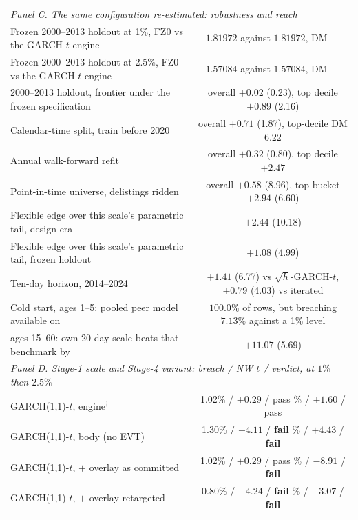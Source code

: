 \begin{tabular}{lcc}
\midrule
\multicolumn{3}{l}{\emph{Panel C. The same configuration re-estimated: robustness and reach}} \\
Frozen 2000--2013 holdout at 1\%, FZ0 vs the GARCH-$t$ engine & \multicolumn{2}{c}{$1.81972$ against $1.81972$, DM ---} \\
Frozen 2000--2013 holdout at 2.5\%, FZ0 vs the GARCH-$t$ engine & \multicolumn{2}{c}{$1.57084$ against $1.57084$, DM ---} \\
2000--2013 holdout, frontier under the frozen specification & \multicolumn{2}{c}{overall $+0.02$ (0.23), top decile $+0.89$ (2.16)} \\
Calendar-time split, train before 2020 & \multicolumn{2}{c}{overall $+0.71$ (1.87), top-decile DM 6.22} \\
Annual walk-forward refit & \multicolumn{2}{c}{overall $+0.32$ (0.80), top decile $+2.47$} \\
Point-in-time universe, delistings ridden & \multicolumn{2}{c}{overall $+0.58$ (8.96), top bucket $+2.94$ (6.60)} \\
Flexible edge over this scale's parametric tail, design era & \multicolumn{2}{c}{$+2.44$ (10.18)} \\
Flexible edge over this scale's parametric tail, frozen holdout & \multicolumn{2}{c}{$+1.08$ (4.99)} \\
Ten-day horizon, 2014--2024 & \multicolumn{2}{c}{$+1.41$ (6.77) vs $\sqrt{h}$-GARCH-$t$, $+0.79$ (4.03) vs iterated} \\
Cold start, ages 1--5: pooled peer model available on & \multicolumn{2}{c}{$100.0\%$ of rows, but breaching $7.13\%$ against a 1\% level} \\
\quad ages 15--60: own 20-day scale beats that benchmark by & \multicolumn{2}{c}{$+11.07$ (5.69)} \\
\midrule
\multicolumn{3}{l}{\emph{Panel D. Stage-1 scale and Stage-4 variant: breach / NW $t$ / verdict, at $1\%$ then $2.5\%$}} \\
GARCH(1,1)-$t$, engine$^{\dagger}$ & \multicolumn{2}{c}{1.02\% / $+0.29$ / pass \quad 2.72\% / $+1.60$ / pass} \\
GARCH(1,1)-$t$, body (no EVT) & \multicolumn{2}{c}{1.30\% / $+4.11$ / \textbf{fail} \quad 3.19\% / $+4.43$ / \textbf{fail}} \\
GARCH(1,1)-$t$, $+$ overlay as committed & \multicolumn{2}{c}{1.02\% / $+0.29$ / pass \quad 1.67\% / $-8.91$ / \textbf{fail}} \\
GARCH(1,1)-$t$, $+$ overlay retargeted & \multicolumn{2}{c}{0.80\% / $-4.24$ / \textbf{fail} \quad 2.15\% / $-3.07$ / \textbf{fail}} \\

\end{tabular}
